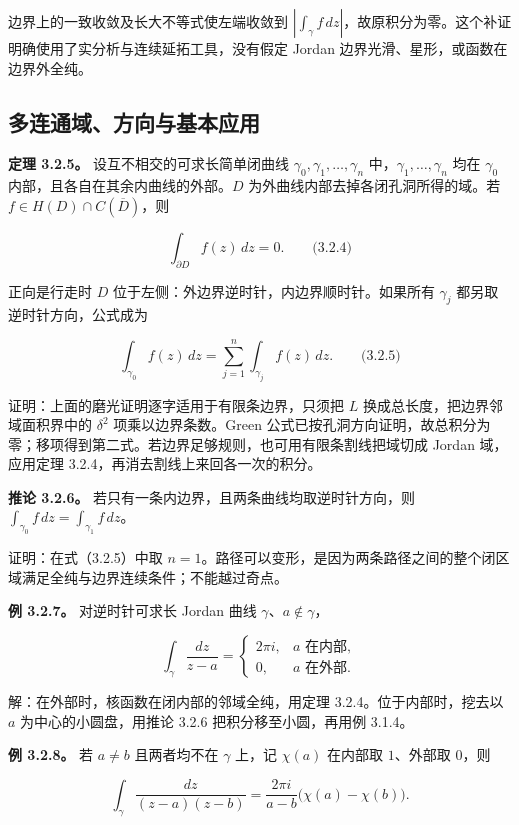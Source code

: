 \documentclass[11pt,a4paper]{article}
\begin{document}
边界上的一致收敛及长大不等式使左端收敛到
\(|\int_\gamma f\,dz|\)，故原积分为零。这个补证明确使用了实分析与连续延拓工具，没有假定
Jordan 边界光滑、星形，或函数在边界外全纯。

\subsection{多连通域、方向与基本应用}\label{ch03-s2-ux591aux8fdeux901aux57dfux65b9ux5411ux4e0eux57faux672cux5e94ux7528}

\textbf{定理 3.2.5。} 设互不相交的可求长简单闭曲线
\(\gamma_0,\gamma_1,\ldots,\gamma_n\) 中，\(\gamma_1,\ldots,\gamma_n\)
均在 \(\gamma_0\) 内部，且各自在其余内曲线的外部。\(D\)
为外曲线内部去掉各闭孔洞所得的域。若
\(f\in H(D)\cap C(\overline D)\)，则

\[
\int_{\partial D}f(z)\,dz=0.
\qquad\text{(3.2.4)}
\]

正向是行走时 \(D\) 位于左侧：外边界逆时针，内边界顺时针。如果所有
\(\gamma_j\) 都另取逆时针方向，公式成为

\[
\int_{\gamma_0}f(z)\,dz
=\sum_{j=1}^{n}\int_{\gamma_j}f(z)\,dz.
\qquad\text{(3.2.5)}
\]

证明：上面的磨光证明逐字适用于有限条边界，只须把 \(L\)
换成总长度，把边界邻域面积界中的 \(\delta^2\) 项乘以边界条数。Green
公式已按孔洞方向证明，故总积分为零；移项得到第二式。若边界足够规则，也可用有限条割线把域切成
Jordan 域，应用定理 3.2.4，再消去割线上来回各一次的积分。

\textbf{推论 3.2.6。} 若只有一条内边界，且两条曲线均取逆时针方向，则
\(\int_{\gamma_0}f\,dz=\int_{\gamma_1}f\,dz\)。

证明：在式（3.2.5）中取
\(n=1\)。路径可以变形，是因为两条路径之间的整个闭区域满足全纯与边界连续条件；不能越过奇点。

\textbf{例 3.2.7。} 对逆时针可求长 Jordan 曲线
\(\gamma\)、\(a\notin\gamma\)，

\[
\int_\gamma\frac{dz}{z-a}
=\begin{cases}2\pi i,&a\text{ 在内部},\\0,&a\text{ 在外部}.\end{cases}
\]

解：在外部时，核函数在闭内部的邻域全纯，用定理 3.2.4。位于内部时，挖去以
\(a\) 为中心的小圆盘，用推论 3.2.6 把积分移至小圆，再用例 3.1.4。

\textbf{例 3.2.8。} 若 \(a\ne b\) 且两者均不在 \(\gamma\) 上，记
\(\chi(a)\) 在内部取 \(1\)、外部取 \(0\)，则

\[
\int_\gamma\frac{dz}{(z-a)(z-b)}
=\frac{2\pi i}{a-b}\bigl(\chi(a)-\chi(b)\bigr).
\]
\end{document}
